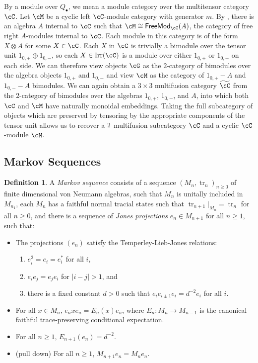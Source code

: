 \documentclass[11pt]{article}
\theoremstyle{plain}
\theoremstyle{definition}
\newtheorem{defn}[thm]{Definition}
\DeclareMathOperator{\Irr}{Irr}
\DeclareMathOperator{\tr}{tr}
\newcommand{\FreeMod}{{\sf FreeMod}}
\begin{document}
By a module over $Q_\bullet$, we mean a module category over the multitensor category $\cC$. Let $\cM$ be a cyclic left $\cC$-module category with generator $m$. By \cite{ostrik03}, %
there is an algebra $A$ internal to $\cC$ such that $\cM\cong\FreeMod_\cC(A)$, the category of free right $A$-modules internal to $\cC$. Each module in this category is of the form $X\otimes A$ for some $X\in\cC$. Each $X$ in $\cC$ is trivially a bimodule over the tensor unit $1_{0,+}\oplus1_{0,-}$, so each $X\in\Irr(\cC)$ is a module over either $1_{0,+}$ or $1_{0,-}$ on each side. We can therefore view objects $\cG$ as the $2$-category of bimodules over the algebra objects $1_{0,+}$ and $1_{0,-}$ and view $\cM$ as the category of $1_{0,+}-A$ and $1_{0,-}-A$ bimodules. We can again obtain a $3\times 3$ multifusion category $\widetilde{\cC}$ from the $2$-category of bimodules over the algebras $1_{0,+}$, $1_{0,-}$, and $A$, into which both $\cC$ and $\cM$ have naturally monoidal embeddings. Taking the full subcategory of objects which are preserved by tensoring by the appropriate components of the tensor unit allows us to recover a $2\time 2$ multifusion subcategory $\cC$ and a cyclic $\cC$-module $\cM$. 



\subsection{Markov Sequences}


\begin{defn}
A \emph{Markov sequence} consists of a sequence $(M_n, \tr_n)_{n\geq 0}$ of finite dimensional von Neumann algebras, such that $M_n$ is unitally included in $M_{n_1}$, each $M_n$ has a faithful normal tracial states such that $\tr_{n+1}|_{M_n} = \tr_n$ for all $n\geq 0$, and there is a sequence of \emph{Jones projections} $e_n \in M_{n+1}$ for all $n\geq 1$, such that:
\begin{itemize}
\item
The projections $(e_n)$ satisfy the Temperley-Lieb-Jones relations:
\begin{enumerate}[(1)]
\item
$e_i^2 = e_i = e_i^*$ for all $i$,
\item
$e_i e_j = e_j e_i$ for $|i-j|>1$, and
\item
there is a fixed constant $d>0$ such that $e_{i} e_{i\pm 1} e_i = d^{-2} e_i$ for all $i$.
\end{enumerate}
\item
For all $x\in M_n$, $e_n x e_n = E_n(x)e_n$, where $E_n: M_n \to M_{n-1}$ is the canonical faithful trace-preserving conditional expectation.
\item
For all $n\geq 1$, $E_{n+1}(e_n) = d^{-2}$.
\item
(pull down)
For all $n\geq 1$, $M_{n+1}e_n = M_n e_n$.

\end{itemize}
\end{defn}
\end{document}
